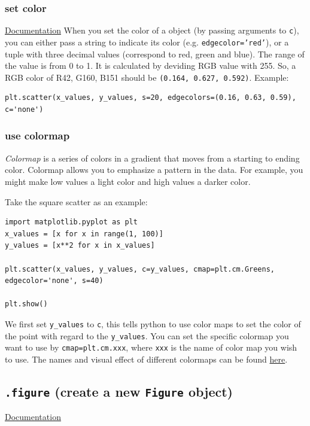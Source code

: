\documentclass[12pt]{book}
\begin{document}
\subsubsection{set color}
\label{sec:org2d8c22f}
\href{https://matplotlib.org/2.0.2/api/colors\_api.html}{Documentation}
When you set the color of a object (by passing arguments to \texttt{c}), you can either pass a string to indicate its color (e.g. \texttt{edgecolor='red'}), or a tuple with three decimal values (correspond to red, green and blue). The range of the value is from 0 to 1. It is calculated by deviding RGB value with 255. So, a RGB color of R42, G160, B151 should be \texttt{(0.164, 0.627, 0.592)}. Example:
\begin{verbatim}
plt.scatter(x_values, y_values, s=20, edgecolors=(0.16, 0.63, 0.59), c='none')
\end{verbatim}

\subsubsection{use colormap}
\label{sec:org0e6c266}
\emph{Colormap} is a series of colors in a gradient that moves from a starting to ending color. Colormap allows you to emphasize a pattern in the data. For example, you might make low values a light color and high values a darker color.

Take the square scatter as an example:
\begin{verbatim}
import matplotlib.pyplot as plt
x_values = [x for x in range(1, 100)]
y_values = [x**2 for x in x_values]

plt.scatter(x_values, y_values, c=y_values, cmap=plt.cm.Greens, edgecolor='none', s=40)

plt.show()
\end{verbatim}
We first set \texttt{y\_values} to \texttt{c}, this tells python to use color maps to set the color of the point with regard to the \texttt{y\_values}. You can set the specific colormap you want to use by \texttt{cmap=plt.cm.xxx}, where \texttt{xxx} is the name of color map you wish to use. The names and visual effect of different colormaps can be found \href{https://matplotlib.org/examples/color/colormaps\_reference.html}{here}.

\subsection{\texttt{.figure} (create a new \texttt{Figure} object)}
\label{sec:orga41be60}
\href{https://matplotlib.org/3.1.0/api/\_as\_gen/matplotlib.pyplot.figure.html}{Documentation}
\end{document}
